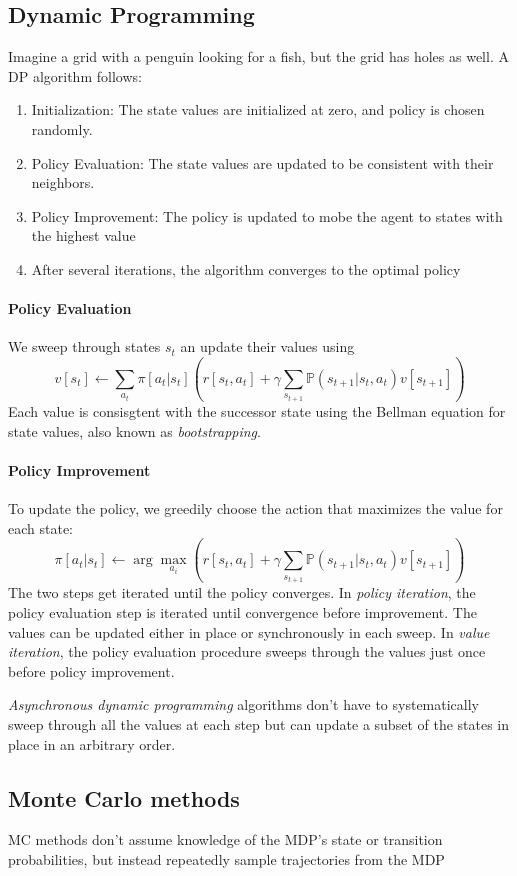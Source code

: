 \documentclass[11pt]{article}
\newcommand{\Pbb}{\mathbb{P}}
\begin{document}
\subsection{Dynamic Programming}
Imagine a grid with a penguin looking for a fish, but the grid has holes as well. A DP algorithm follows:
\begin{enumerate}
    \item Initialization: The state values are initialized at zero, and policy is chosen randomly. 
    \item Policy Evaluation: The state values are updated to be consistent with their neighbors. 
    \item Policy Improvement: The policy is updated to mobe the agent to states with the highest value
    \item After several iterations, the algorithm converges to the optimal policy
\end{enumerate}

\paragraph{Policy Evaluation} We sweep through states $s_t$ an update their values using $$v[s_t] \leftarrow \sum_{a_t}\pi [a_t|s_t](r[s_t,a_t]+\gamma \sum_{s_{t+1}}\Pbb (s_{t+1}|s_t,a_t)v[s_{t+1}])$$
Each value is consisgtent with the successor state using the Bellman equation for state values, also known as \emph{bootstrapping}.

\paragraph{Policy Improvement} To update the policy, we greedily choose the action that maximizes the value for each state:
\[
\pi [a_t | s_t] \leftarrow \arg \max_{a_i} (r[s_t,a_t]+\gamma \sum_{s_{t+1}}\Pbb (s_{t+1}|s_t,a_t)v[s_{t+1}])
\]
The two steps get iterated until the policy converges. In \emph{policy iteration}, the policy evaluation step is iterated until convergence before improvement. The values can be updated
either in place or synchronously in each sweep. In \emph{value iteration}, the policy evaluation procedure sweeps through the values just once before policy improvement. 


\emph{Asynchronous dynamic programming} algorithms don’t have to systematically sweep through all the values at each step but can update a subset of the states in place in an arbitrary order.

\subsection{Monte Carlo methods}
MC methods don't assume knowledge of the MDP's state or transition probabilities, but instead repeatedly sample trajectories from the MDP
\end{document}
